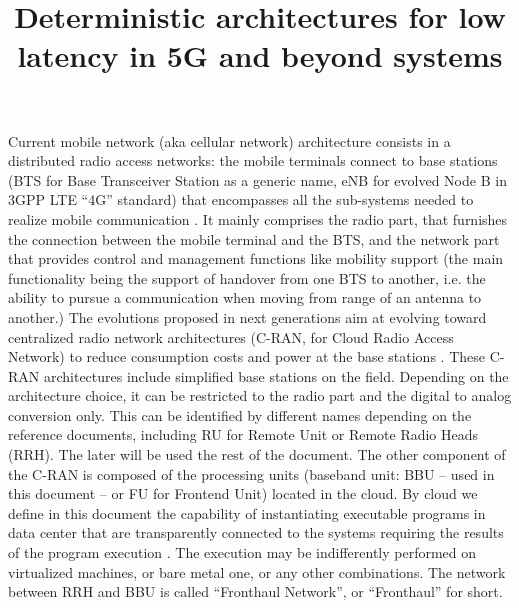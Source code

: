 \documentclass{article}
\begin{document}
\title{Deterministic architectures for low latency in 5G and beyond systems}


\maketitle

 Current mobile network (aka cellular network) architecture consists in a distributed radio access networks: the mobile terminals connect to base stations (BTS for Base Transceiver Station as a generic name, eNB for evolved Node B in 3GPP LTE “4G” standard) that encompasses all the sub-systems needed to realize mobile communication \cite{bouguen2012lte}. 
 It mainly comprises the radio part, that furnishes the connection between the mobile terminal and the BTS, and the network part that provides control and management functions like mobility support (the main functionality being the support of handover from one BTS to another, i.e. the ability to pursue a communication when moving from range of an antenna to another.) The evolutions proposed in next generations aim at evolving toward centralized radio network architectures (C-RAN, for Cloud Radio Access Network) to reduce consumption costs and power at the base stations \cite{mobile2011c}. These C-RAN architectures include simplified base stations on the field. Depending on the architecture choice, it can be restricted to the radio part and the digital to analog conversion only. This can be identified by different names depending on the reference documents, including RU for Remote Unit or Remote Radio Heads (RRH). The later will be used the rest of the document. The other component of the C-RAN is composed of the processing units (baseband unit: BBU – used in this document – or FU for Frontend Unit) located in the cloud. By cloud we define in this document the capability of instantiating executable programs in data center that are transparently connected to the systems  requiring the results of the program execution \cite{mobile2011c}. The execution may be indifferently performed on virtualized machines, or bare metal one, or any other combinations. The network between RRH and BBU is called “Fronthaul Network”, or ``Fronthaul'' for short.\\
\end{document}

